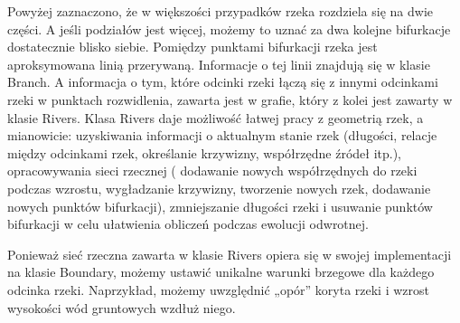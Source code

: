 \documentclass[]{pracamgr}
\begin{document}
      Powyżej zaznaczono, że w większości przypadków rzeka rozdziela się na dwie części. A jeśli podziałów jest więcej, możemy to uznać za dwa kolejne bifurkacje dostatecznie blisko siebie. Pomiędzy punktami bifurkacji rzeka jest aproksymowana linią przerywaną. Informacje o tej linii znajdują się w klasie Branch. A informacja o tym, które odcinki rzeki łączą się z innymi odcinkami rzeki w punktach rozwidlenia, zawarta jest w grafie, który z kolei jest zawarty w klasie Rivers. Klasa Rivers daje możliwość łatwej pracy z geometrią rzek, a mianowicie: uzyskiwania informacji o aktualnym stanie rzek (długości, relacje między odcinkami rzek, określanie krzywizny, współrzędne źródeł itp.), opracowywania sieci rzecznej ( dodawanie nowych współrzędnych do rzeki podczas wzrostu, wygładzanie krzywizny, tworzenie nowych rzek, dodawanie nowych punktów bifurkacji), zmniejszanie długości rzeki i usuwanie punktów bifurkacji w celu ułatwienia obliczeń podczas ewolucji odwrotnej.

      Ponieważ sieć rzeczna zawarta w klasie Rivers opiera się w swojej implementacji na klasie Boundary, możemy ustawić unikalne warunki brzegowe dla każdego odcinka rzeki. Naprzykład, możemy uwzględnić „opór” koryta rzeki i wzrost wysokości wód gruntowych wzdłuż niego.
\end{document}
